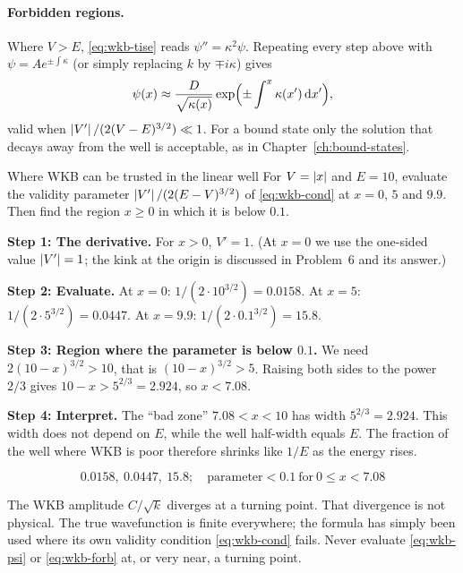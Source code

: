 \paragraph{Forbidden regions.} Where $V>E$, \cref{eq:wkb-tise} reads $\psi''=\kappa^2\psi$. Repeating every step above with $\psi=A e^{\pm\int\kappa}$ (or simply replacing $k$ by $\mp i\kappa$) gives
\begin{equation}
\psi(x)\approx\frac{D}{\sqrt{\kappa(x)}}\exp\Bigl(\pm\int^x\kappa(x')\,\mathrm{d} x'\Bigr),
\label{eq:wkb-forb}
\end{equation}
valid when $\left\lvert V'\right\rvert/(2(V-E)^{3/2})\ll1$. For a bound state only the solution that decays away from the well is acceptable, as in Chapter~\ref{ch:bound-states}.

\begin{sample}{Where WKB can be trusted in the linear well}
For $V=\left\lvert x\right\rvert$ and $E=10$, evaluate the validity parameter $\left\lvert V'\right\rvert/(2(E-V)^{3/2})$ of \cref{eq:wkb-cond} at $x=0$, $5$ and $9.9$. Then find the region $x\ge0$ in which it is below $0.1$.

\textbf{Step 1: The derivative.} For $x>0$, $V'=1$. (At $x=0$ we use the one-sided value $\left\lvert V'\right\rvert=1$; the kink at the origin is discussed in Problem~6 and its answer.)

\textbf{Step 2: Evaluate.} At $x=0$: $1/(2\cdot10^{3/2})=0.0158$. At $x=5$: $1/(2\cdot5^{3/2})=0.0447$. At $x=9.9$: $1/(2\cdot0.1^{3/2})=15.8$.

\textbf{Step 3: Region where the parameter is below $0.1$.} We need $2(10-x)^{3/2}>10$, that is $(10-x)^{3/2}>5$. Raising both sides to the power $2/3$ gives $10-x>5^{2/3}=2.924$, so $x<7.08$.

\textbf{Step 4: Interpret.} The ``bad zone'' $7.08<x<10$ has width $5^{2/3}=2.924$. This width does not depend on $E$, while the well half-width equals $E$. The fraction of the well where WKB is poor therefore shrinks like $1/E$ as the energy rises.

\[
\boxed{0.0158,\ 0.0447,\ 15.8;\quad\text{parameter}<0.1\ \text{for}\ 0\le x<7.08}
\]
\end{sample}

\begin{pitfall}
The WKB amplitude $C/\sqrt{k}$ diverges at a turning point. That divergence is not physical. The true wavefunction is finite everywhere; the formula has simply been used where its own validity condition \cref{eq:wkb-cond} fails. Never evaluate \cref{eq:wkb-psi} or \cref{eq:wkb-forb} at, or very near, a turning point.
\end{pitfall}

